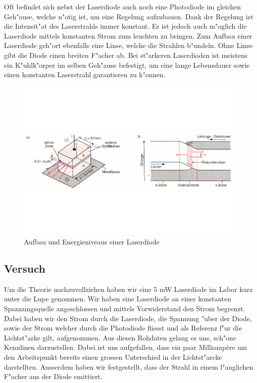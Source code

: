 \begin{refsection}
Oft befindet sich nebst der Laserdiode auch noch eine Photodiode im gleichen 
Geh"ause, welche n"otig ist, um eine Regelung aufzubauen. Dank der Regelung 
ist die Intensit"at des Laserstrahls immer konstant. Es ist jedoch auch 
m"oglich die Laserdiode mittels konstanten Strom zum leuchten zu bringen. Zum 
Aufbau einer Laserdiode geh"ort ebenfalls eine Linse, welche die Strahlen 
b"undeln. Ohne Linse gibt die Diode einen breiten F"acher ab. Bei st"arkeren 
Laserdioden ist meistens ein K"uhlk"orper im selben Geh"ause befestigt, um 
eine lange Lebensdauer sowie einen konstanten Laserstrahl garantieren zu 
k"onnen. 
\begin{figure}
\centering
\includegraphics[scale=0.35]{laser/bilder/laserdiodeb.pdf}
\caption{Aufbau und Energieniveaus einer Laserdiode \cite{halbleiterlaser}}
\label{fig:Laserdiode}
\end{figure}

\subsection{Versuch}

Um die Theorie nachzuvollziehen haben wir eine 5 mW Laserdiode im Labor kurz 
unter die Lupe genommen. Wir haben eine Laserdiode an einer konstanten 
Spannungsquelle angeschlossen und mittels Vorwiderstand den Strom 
begrenzt. Dabei haben wir den Strom durch die Laserdiode, die Spannung "uber 
der Diode, sowie der Strom welcher durch die Photodiode fliesst und als 
Referenz f"ur die Lichtst"arke gilt, aufgenommen. Aus diesen Rohdaten gelang 
es uns, sch"one Kennlinen darzustellen. Dabei ist uns aufgefallen, dass ein 
paar Milliamp\`{e}re um den Arbeitspunkt bereits einen grossen Unterschied in
der Lichtst"arcke darstellten. Ausserdem haben wir festgestellt,
dass der Strahl in einem l"anglichen F"acher aus der Diode emittiert.


\end{refsection}
